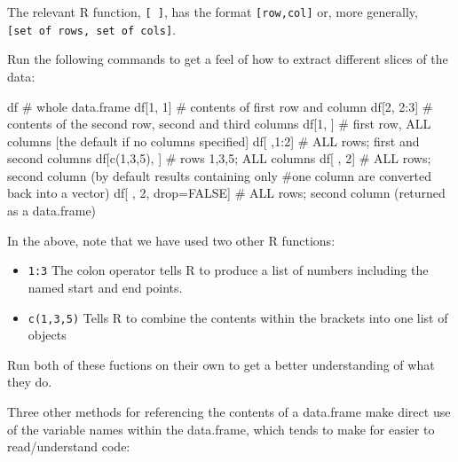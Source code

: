 \documentclass[
  letterpaper,
  DIV=11,
  numbers=noendperiod,
  oneside]{scrreprt}
\newenvironment{Shaded}{\begin{snugshade}}{\end{snugshade}}
\newcommand{\CommentTok}[1]{\textcolor[rgb]{0.37,0.37,0.37}{#1}}
\newcommand{\ConstantTok}[1]{\textcolor[rgb]{0.56,0.35,0.01}{#1}}
\newcommand{\DecValTok}[1]{\textcolor[rgb]{0.68,0.00,0.00}{#1}}
\newcommand{\FunctionTok}[1]{\textcolor[rgb]{0.28,0.35,0.67}{#1}}
\newcommand{\NormalTok}[1]{\textcolor[rgb]{0.00,0.23,0.31}{#1}}
\newcommand{\OtherTok}[1]{\textcolor[rgb]{0.00,0.23,0.31}{#1}}
\newcommand{\SpecialCharTok}[1]{\textcolor[rgb]{0.37,0.37,0.37}{#1}}
\begin{document}
The relevant R function, \texttt{{[}\ {]}}, has the format
\texttt{{[}row,col{]}} or, more generally,
\texttt{{[}set\ of\ rows,\ set\ of\ cols{]}}.

Run the following commands to get a feel of how to extract different
slices of the data:

\begin{Shaded}
\begin{Highlighting}[]
\NormalTok{df }\CommentTok{\# whole data.frame}
\NormalTok{df[}\DecValTok{1}\NormalTok{, }\DecValTok{1}\NormalTok{] }\CommentTok{\# contents of first row and column}
\NormalTok{df[}\DecValTok{2}\NormalTok{, }\DecValTok{2}\SpecialCharTok{:}\DecValTok{3}\NormalTok{] }\CommentTok{\# contents of the second row, second and third columns}
\NormalTok{df[}\DecValTok{1}\NormalTok{, ] }\CommentTok{\# first row, ALL columns [the default if no columns specified]}
\NormalTok{df[ ,}\DecValTok{1}\SpecialCharTok{:}\DecValTok{2}\NormalTok{] }\CommentTok{\# ALL rows; first and second columns}
\NormalTok{df[}\FunctionTok{c}\NormalTok{(}\DecValTok{1}\NormalTok{,}\DecValTok{3}\NormalTok{,}\DecValTok{5}\NormalTok{), ] }\CommentTok{\# rows 1,3,5; ALL columns}
\NormalTok{df[ , }\DecValTok{2}\NormalTok{] }\CommentTok{\# ALL rows; second column (by default results containing only }
             \CommentTok{\#one column are converted back into a vector)}
\NormalTok{df[ , }\DecValTok{2}\NormalTok{, drop}\OtherTok{=}\ConstantTok{FALSE}\NormalTok{] }\CommentTok{\# ALL rows; second column (returned as a data.frame)}
\end{Highlighting}
\end{Shaded}

In the above, note that we have used two other R functions:

\begin{itemize}
\item
  \texttt{1:3} The colon operator tells R to produce a list of numbers
  including the named start and end points.
\item
  \texttt{c(1,3,5)} Tells R to combine the contents within the brackets
  into one list of objects
\end{itemize}

Run both of these fuctions on their own to get a better understanding of
what they do.

Three other methods for referencing the contents of a data.frame make
direct use of the variable names within the data.frame, which tends to
make for easier to read/understand code:
\end{document}
